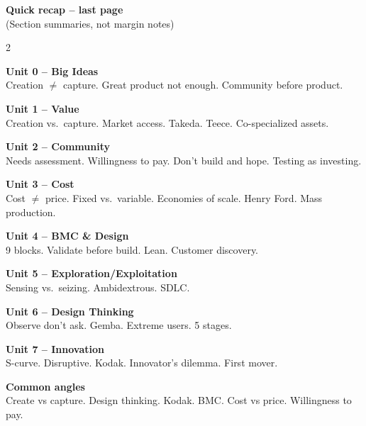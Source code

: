 \documentclass[8pt,landscape,a4paper]{article}
\begin{document}
\newpage
\vspace*{0.3em}
\begin{center}
\textbf{\color{eublue}Quick recap -- last page}\\[0.3em]
\small\textcolor{notegrey}{(Section summaries, not margin notes)}
\end{center}
\vspace{0.4em}
\noindent\color{notegrey}
\setlength{\parskip}{0.3em}
\begin{multicols}{2}

\textbf{Unit 0 -- Big Ideas}\\
Creation $\neq$ capture. Great product not enough. Community before product.

\textbf{Unit 1 -- Value}\\
Creation vs.\ capture. Market access. Takeda. Teece. Co-specialized assets.

\textbf{Unit 2 -- Community}\\
Needs assessment. Willingness to pay. Don't build and hope. Testing as investing.

\textbf{Unit 3 -- Cost}\\
Cost $\neq$ price. Fixed vs.\ variable. Economies of scale. Henry Ford. Mass production.

\textbf{Unit 4 -- BMC \& Design}\\
9 blocks. Validate before build. Lean. Customer discovery.

\textbf{Unit 5 -- Exploration/Exploitation}\\
Sensing vs.\ seizing. Ambidextrous. SDLC.

\textbf{Unit 6 -- Design Thinking}\\
Observe don't ask. Gemba. Extreme users. 5 stages.

\textbf{Unit 7 -- Innovation}\\
S-curve. Disruptive. Kodak. Innovator's dilemma. First mover.

\textbf{Common angles}\\
Create vs capture. Design thinking. Kodak. BMC. Cost vs price. Willingness to pay.

\end{multicols}
\vfill
\normalsize\normalfont\color{black}
\end{document}
